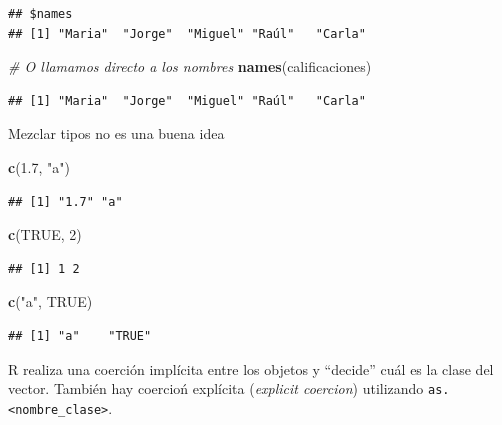 \documentclass[]{article}
\newenvironment{Shaded}{\begin{snugshade}}{\end{snugshade}}
\newcommand{\KeywordTok}[1]{\textcolor[rgb]{0.13,0.29,0.53}{\textbf{{#1}}}}
\newcommand{\DecValTok}[1]{\textcolor[rgb]{0.00,0.00,0.81}{{#1}}}
\newcommand{\FloatTok}[1]{\textcolor[rgb]{0.00,0.00,0.81}{{#1}}}
\newcommand{\StringTok}[1]{\textcolor[rgb]{0.31,0.60,0.02}{{#1}}}
\newcommand{\CommentTok}[1]{\textcolor[rgb]{0.56,0.35,0.01}{\textit{{#1}}}}
\newcommand{\OtherTok}[1]{\textcolor[rgb]{0.56,0.35,0.01}{{#1}}}
\newcommand{\NormalTok}[1]{{#1}}
\begin{document}
\begin{verbatim}
## $names
## [1] "Maria"  "Jorge"  "Miguel" "Raúl"   "Carla"
\end{verbatim}

\begin{Shaded}
\begin{Highlighting}[]
\CommentTok{# O llamamos directo a los nombres}
\KeywordTok{names}\NormalTok{(calificaciones)}
\end{Highlighting}
\end{Shaded}

\begin{verbatim}
## [1] "Maria"  "Jorge"  "Miguel" "Raúl"   "Carla"
\end{verbatim}

Mezclar tipos no es una buena idea

\begin{Shaded}
\begin{Highlighting}[]
\KeywordTok{c}\NormalTok{(}\FloatTok{1.7}\NormalTok{, }\StringTok{"a"}\NormalTok{)}
\end{Highlighting}
\end{Shaded}

\begin{verbatim}
## [1] "1.7" "a"
\end{verbatim}

\begin{Shaded}
\begin{Highlighting}[]
\KeywordTok{c}\NormalTok{(}\OtherTok{TRUE}\NormalTok{, }\DecValTok{2}\NormalTok{)}
\end{Highlighting}
\end{Shaded}

\begin{verbatim}
## [1] 1 2
\end{verbatim}

\begin{Shaded}
\begin{Highlighting}[]
\KeywordTok{c}\NormalTok{(}\StringTok{"a"}\NormalTok{, }\OtherTok{TRUE}\NormalTok{)}
\end{Highlighting}
\end{Shaded}

\begin{verbatim}
## [1] "a"    "TRUE"
\end{verbatim}

R realiza una coerción implícita entre los objetos y ``decide'' cuál es
la clase del vector. También hay coercioń explícita (\emph{explicit
coercion}) utilizando
\texttt{as.\textless{}nombre\_clase\textgreater{}}.
\end{document}
